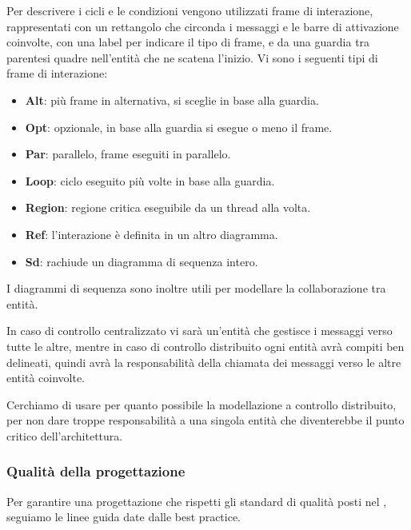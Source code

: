         Per descrivere i cicli e le condizioni vengono utilizzati frame di interazione, rappresentati con un rettangolo che circonda i messaggi e le barre di attivazione coinvolte, con una label per indicare il tipo di frame, e da una guardia tra parentesi quadre nell'entità che ne scatena l'inizio.
        Vi sono i seguenti tipi di frame di interazione:
        \begin{itemize}
            \item \textbf{Alt}: più frame in alternativa, si sceglie in base alla guardia.
            \item \textbf{Opt}: opzionale, in base alla guardia si esegue o meno il frame.
            \item \textbf{Par}: parallelo, frame eseguiti in parallelo.
            \item \textbf{Loop}: ciclo eseguito più volte in base alla guardia.
            \item \textbf{Region}: regione critica eseguibile da un thread alla volta.
            \item \textbf{Ref}: l'interazione è definita in un altro diagramma.
            \item \textbf{Sd}: rachiude un diagramma di sequenza intero.
        \end{itemize}
        I diagrammi di sequenza sono inoltre utili per modellare la collaborazione tra entità.\par
        In caso di controllo centralizzato vi sarà un'entità che gestisce i messaggi verso tutte le altre, mentre in caso di controllo distribuito ogni entità avrà compiti ben delineati, quindi avrà la responsabilità della chiamata dei messaggi verso le altre entità coinvolte.\par
        Cerchiamo di usare per quanto possibile la modellazione a controllo distribuito, per non dare troppe responsabilità a una singola entità che diventerebbe il punto critico dell'architettura.



		\newpage

		\subsubsection{Qualità della progettazione}\label{PP:Sviluppo:QualitàProgettazione}
		Per garantire una progettazione che rispetti gli standard di qualità posti nel {\PdQd}, seguiamo le linee guida date dalle best practice.

